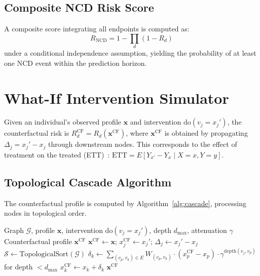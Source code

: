 \documentclass[runningheads]{llncs}
\begin{document}
\subsection{Composite NCD Risk Score}\label{sec:composite}

A composite score integrating all endpoints is computed as:
\begin{equation}\label{eq:composite}
R_{\mathrm{NCD}} = 1 - \prod_{d} (1 - R_d)
\end{equation}
under a conditional independence assumption, yielding the probability
of at least one NCD event within the prediction horizon.

\section{What-If Intervention Simulator}\label{sec:whatif}

Given an individual's observed profile $\mathbf{x}$ and intervention
$\mathrm{do}(v_j = x_j')$, the counterfactual risk is
$R_d^{\mathrm{CF}} = R_d(\mathbf{x}^{\mathrm{CF}})$, where
$\mathbf{x}^{\mathrm{CF}}$ is obtained by propagating
$\Delta_j = x_j' - x_j$ through downstream nodes.  This corresponds
to the effect of treatment on the treated
(ETT)~\cite{pearl2009causality}:
$\mathrm{ETT} = E[Y_{x'} - Y_x \mid X=x, Y=y]$.

\subsection{Topological Cascade Algorithm}\label{sec:cascade}

The counterfactual profile is computed by
Algorithm~\ref{alg:cascade}, processing nodes in topological order.

\begin{algorithm}[t]
\caption{Topological Counterfactual Cascade}
\label{alg:cascade}
\begin{algorithmic}[1]
\REQUIRE Graph $\mathcal{G}$, profile $\mathbf{x}$, intervention
  $\mathrm{do}(v_j = x_j')$, depth $d_{\max}$, attenuation $\gamma$
\ENSURE Counterfactual profile $\mathbf{x}^{\mathrm{CF}}$
\STATE $\mathbf{x}^{\mathrm{CF}} \leftarrow \mathbf{x}$;
  $x_j^{\mathrm{CF}} \leftarrow x_j'$;
  $\Delta_j \leftarrow x_j' - x_j$
\STATE $\mathcal{S} \leftarrow \text{TopologicalSort}(\mathcal{G})$
  \STATE $\delta_k \leftarrow \sum_{(v_p, v_k) \in E} W_{(v_p,v_k)} \cdot (x_p^{\mathrm{CF}} - x_p) \cdot \gamma^{\text{depth}(v_j,v_p)}$ for depth $< d_{\max}$
  \STATE $x_k^{\mathrm{CF}} \leftarrow x_k + \delta_k$
\ENDFOR
\RETURN $\mathbf{x}^{\mathrm{CF}}$
\end{algorithmic}
\end{algorithm}
\end{document}
